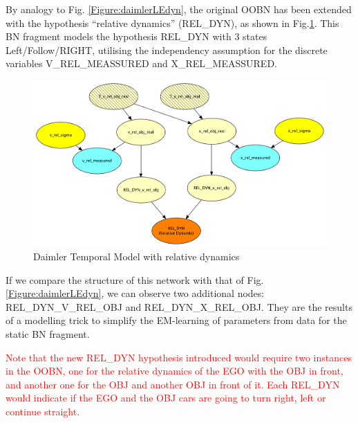 {By analogy to Fig. \ref{Figure:daimlerLEdyn}, the original OOBN has been extended with the hypothesis ``relative dynamics'' (REL\_DYN), as shown in Fig.\ref{Figure:daimlerreldyn}. This BN fragment  models the hypothesis REL\_DYN with 3 states Left/Follow/RIGHT, utilising the independency assumption for the discrete variables V\_REL\_MEASSURED and X\_REL\_MEASSURED.

\begin{figure}
\begin{center}
\includegraphics[scale=0.4]{./figures/Daimlerreldyn.pdf}
\end{center}
\caption{\label{Figure:daimlerreldyn}Daimler Temporal Model with relative dynamics}
\end{figure}

If we compare the structure of this network with that of Fig. \ref{Figure:daimlerLEdyn}, we can observe two additional nodes:  REL\_DYN\_V\_REL\_OBJ and REL\_DYN\_X\_REL\_OBJ. They are the results of a modelling trick to simplify the EM-learning of parameters from data for the static BN fragment.

\textcolor{red}{Note that the new REL\_DYN hypothesis introduced would require two instances in the OOBN, one for the relative dynamics of the EGO with the OBJ in front, and another one for the OBJ and another OBJ in front of it. Each REL\_DYN would indicate if the EGO and the OBJ cars are going to turn right, left or continue straight.}
}

